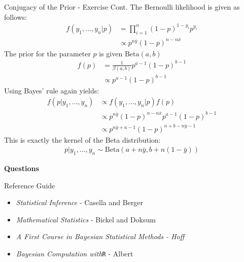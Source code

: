 \documentclass{beamer}
\begin{document}
\begin{frame}{Conjugacy of the Prior - Exercise Cont.}
\small
The Bernoulli likelihood is given as follows:
\begin{align*}
f(y_{1}, \ldots, y_{n}|p) &= \prod_{i=1}^{n}(1-p)^{1-y_{i}}p^{y_{i}} \\
&\propto p^{n\bar{y}} (1-p)^{n-n\bar{x}}
\end{align*}
The prior for the parameter $p$ is given $\mathrm{Beta}(a, b)$
\begin{align*}
f(p) &= \frac{1}{\beta(a, b)} p^{a-1}(1-p)^{b-1}\\
&\propto p^{a-1}(1-p)^{b-1}
\end{align*}
Using Bayes' rule again yields:
\begin{align*}
f(p|y_{1},\ldots, y_{n}) &\propto   f(y_{1},\ldots, y_{n}|p) f(p) \\
&\propto p^{n\bar{y}} (1-p)^{n-n\bar{x}} p^{a-1}(1-p)^{b-1}\\
&\propto p^{n\bar{y}+a-1}(1-p)^{n+b-n\bar{y}-1}
\end{align*}
This is exactly the kernel of the Beta distribution:
\begin{align*}
p|y_{1},\ldots, y_{n} \sim\mathrm{Beta}(a+n\bar{y}, b + n(1-\bar{y}))
\end{align*}
\end{frame}

\begin{frame}
\begin{center}
\textbf{Questions}
\end{center}
\end{frame}

\begin{frame}{Reference Guide}
\begin{itemize}
\item{\emph{Statistical Inference} - Casella and Berger}
\item{\emph{Mathematical Statistics} - Bickel and Doksum}
\item{\emph{A First Course in Bayesian Statistical Methods - Hoff}}
\item{\emph{Bayesian Computation with}\texttt{R} - Albert}
\end{itemize}
\end{frame}
\end{document}
